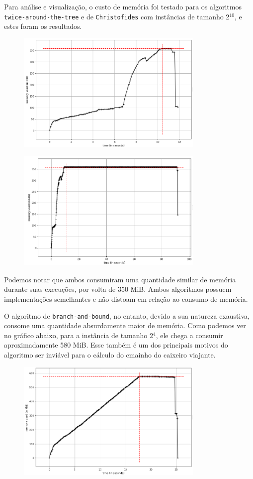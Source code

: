 \documentclass{article}
\begin{document}
Para análise e visualização, o custo de memória foi testado para os algoritmos \texttt{twice-around-the-tree} e de \texttt{Christofides} com instâncias de tamanho 2$^{10}$, e estes foram os resultados.

\begin{figure} [H]
	\includegraphics[width=9cm, scale=1.5]{images/tatmem.png}
	\centering
\end{figure}

\begin{figure} [H]
	\includegraphics[width=9cm, scale=1.5]{images/crmem.png}
	\centering
\end{figure}

Podemos notar que ambos consumiram uma quantidade similar de memória durante suas execuções, por volta de 350 MiB. Ambos algoritmos possuem implementações semelhantes e não distoam em relação ao consumo de memória.

O algoritmo de \texttt{branch-and-bound}, no entanto, devido a sua natureza exaustiva, consome uma quantidade absurdamente maior de memória. Como podemos ver no gráfico abaixo, para a instância de tamanho 2$^{4}$, ele chega a consumir aproximadamente 580 MiB. Esse também é um dos principais motivos do algoritmo ser inviável para o cálculo do cmainho do caixeiro viajante.

\begin{figure} [H]
	\includegraphics[width=9cm, scale=1.5]{images/bnbmem.png}
	\centering
\end{figure}
\end{document}
